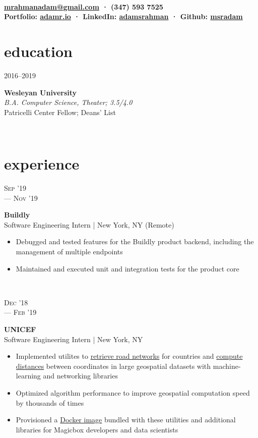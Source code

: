 \documentclass[letterpaper, 10.5pt]{article}
\author{Adam Rahman}
\makeatletter
\renewcommand{\maketitle}{
	\hspace{.125\textwidth}
	\begin{minipage}[t]{.75\textwidth}
    \begin{center}
        \fontsize{16pt}{15pt}\selectfont\bfseries \theauthor \\
        \fontsize{10pt}{15pt}\selectfont\sf
        \href{mailto:mrahmanadam@gmail.com}{mrahmanadam@gmail.com} · (347) 593 7525 \\
        Portfolio: \href{http://adamr.io}{adamr.io} · 
        LinkedIn: \href{https://www.linkedin.com/in/adamsrahman/}{adamsrahman} · 
        Github: \href{https://github.com/msradam}{msradam}  \\ 
        \end{center}
    \end{minipage}}
\newcommand{\eduentry}[4]{
    \begin{minipage}[t]{.15\linewidth}
    \hfill \textsc{#1}
    \end{minipage}
    \hfill\vline\hfill
    \begin{minipage}[t]{.80\linewidth}
    {\bf\large#2}
    \vspace{1pt}
    \\\textit{#3} \small{#4}
    \end{minipage}\\
    \vspace{.125cm}
    }
\newcommand{\expentry}[5]{
    \begin{minipage}[t]{.15\linewidth}
    \hfill \textsc{#1} \\
    \hfill \hspace*{5pt}\hfill --- \textsc{#2}
    \end{minipage}
    \hfill\vline\hfill
    \begin{minipage}[t]{.80\linewidth}
    {\bf\large#3}
    \\ #4 
    \vspace{-1.5mm}
    \small{#5}
    \end{minipage}\\
    \vspace{.125cm}
    }
\makeatother
\begin{document}
    \maketitle
    \vspace{.125cm}


    \section{education}
    \eduentry{2016--2019}
    {Wesleyan University}
    {B.A. Computer Science, Theater; 3.5/4.0}
    {\\ Patricelli Center Fellow; Deans' List}

    \section{experience}
    \expentry{Sep '19}
    {Nov '19}
    {Buildly}
    {Software Engineering Intern | New York, NY (Remote)}
    {

        \begin{itemize}{\leftmargin=0.5em \itemindent=0em}
          \setlength\itemsep{0.1mm}
          \item Debugged and tested features for the Buildly product backend, including the management of multiple endpoints
          \item Maintained and executed unit and integration tests for the product core 
        \end{itemize}
        
    }

    \expentry{Dec '18}
    {Feb '19}
    {UNICEF}
    {Software Engineering Intern | New York, NY}
    {

        \begin{itemize}{\leftmargin=0.5em \itemindent=0em}
          \setlength\itemsep{0.1mm}
          \item Implemented utilites to \href{https://github.com/unicef/magicbox-download-roads}{retrieve road networks} for countries and \href{https://github.com/msradam/magicbox-site-routing}{compute distances} between coordinates in large geospatial datasets with machine-learning and networking libraries
          \item Optimized algorithm performance to improve geospatial computation speed by thousands of times 
          \item Provisioned a \href{https://hub.docker.com/r/msradam/magicbox-tools}{Docker image} bundled with these utilities and additional libraries for Magicbox developers and data scientists
        \end{itemize}
        
    }
\end{document}
